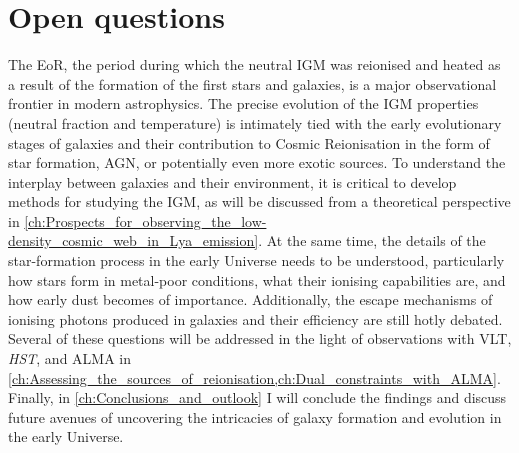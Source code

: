 \section{Open questions}

The EoR, the period during which the neutral IGM was reionised and heated as a result of the formation of the first stars and galaxies, is a major observational frontier in modern astrophysics. The precise evolution of the IGM properties (neutral fraction and temperature) is intimately tied with the early evolutionary stages of galaxies and their contribution to Cosmic Reionisation in the form of star formation, AGN, or potentially even more exotic sources. To understand the interplay between galaxies and their environment, it is critical to develop methods for studying the IGM, as will be discussed from a theoretical perspective in \cref{ch:Prospects_for_observing_the_low-density_cosmic_web_in_Lya_emission}. At the same time, the details of the star-formation process in the early Universe needs to be understood, particularly how stars form in metal-poor conditions, what their ionising capabilities are, and how early dust becomes of importance. Additionally, the escape mechanisms of ionising photons produced in galaxies and their efficiency are still hotly debated. Several of these questions will be addressed in the light of observations with VLT, \textit{HST}, and ALMA in \cref{ch:Assessing_the_sources_of_reionisation,ch:Dual_constraints_with_ALMA}. Finally, in \cref{ch:Conclusions_and_outlook} I will conclude the findings and discuss future avenues of uncovering the intricacies of galaxy formation and evolution in the early Universe.
